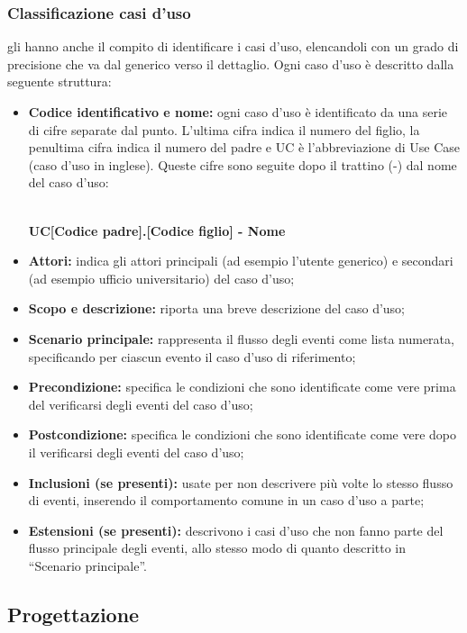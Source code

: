 \documentclass[NormeDiProgetto.tex]{subfiles}
\begin{document}
\subsubsection{Classificazione casi d'uso} gli \alisti{} hanno anche il compito di identificare i casi d’uso, elencandoli con un grado di precisione che va dal generico verso il dettaglio. Ogni caso d’uso è descritto dalla seguente struttura:\\
\begin{itemize}
	\item \textbf{Codice identificativo e nome:} ogni caso d'uso è identificato da una serie di cifre separate dal punto. L'ultima cifra indica il numero del figlio, la penultima cifra indica il numero del padre e UC è l'abbreviazione di Use Case (caso d'uso in inglese). Queste cifre sono seguite dopo il trattino (-) dal nome del caso d'uso: \\\\
	\centerline{\textbf{UC[Codice padre].[Codice figlio] - Nome}}
	\item \textbf{Attori:} indica gli attori principali (ad esempio l’utente generico) e
	secondari (ad esempio ufficio universitario) del caso d’uso;
	\item \textbf{Scopo e descrizione:} riporta una breve descrizione del caso d’uso;
	\item \textbf{Scenario principale:} rappresenta il flusso degli eventi come lista
	numerata, specificando per ciascun evento il caso d'uso di riferimento;
	\item \textbf{Precondizione:} specifica le condizioni che sono identificate come vere
	prima del verificarsi degli eventi del caso d’uso;
	\item \textbf{Postcondizione:} specifica le condizioni che sono identificate come
	vere dopo il verificarsi degli eventi del caso d’uso;
	\item \textbf{Inclusioni (se presenti):} usate per non descrivere più volte lo stesso flusso di eventi,
	inserendo il comportamento comune in un caso d’uso a parte;
	\item \textbf{Estensioni (se presenti):} descrivono i casi d’uso che non fanno parte del flusso
	principale degli eventi, allo stesso modo di quanto descritto in “Scenario
	principale”.
\end{itemize}

\subsection{Progettazione}
\end{document}
